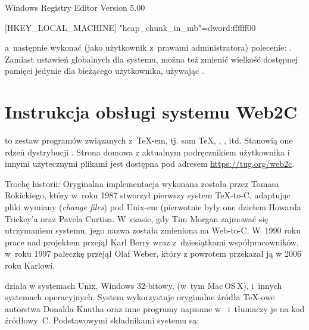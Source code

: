 \documentclass{article}
\begin{document}
\begin{sverbatim}
Windows Registry Editor Version 5.00

[HKEY_LOCAL_MACHINE\Software\Cygwin]
"heap_chunk_in_mb"=dword:ffffff00
\end{sverbatim}

\noindent a~następnie wykonać (jako użytkownik z~prawami administratora)
polecenie: .  Zamiast ustawień globalnych dla
systemu, można też zmienić wielkość dostępnej pamięci jedynie dla bieżącego
użytkownika, używając .


\section{Instrukcja obsługi systemu Web2C}

\Webc{} to zestaw programów związanych z~\TeX-em, tj.  sam \TeX{}, \MF{},
\MP, \BibTeX{} itd. Stanowią one rdzeń dystrybucji \TL{}. Strona domowa \Webc{} z aktualnym
podręcznikiem użytkownika i innymi użytecznymi plikami jest dostępna pod adresem \url{https://tug.org/web2c}.

Trochę historii: Oryginalna implementacja wykonana została przez Tomasa Rokickiego, który
w~roku 1987 stworzył pierwszy system \TeX{}-to-C, adaptując pliki wymiany
(\emph{change files}) pod Unix-em (pierwotnie były one dziełem Howarda
Trickey'a oraz Pavela Curtisa.  W~czasie, gdy Tim Morgan zajmować się  utrzymaniem
systemu, jego nazwa została zmieniona na Web-to-C\@. W~1990 roku prace nad
projektem przejął Karl Berry wraz z~dziesiątkami współpracowników, w~roku
1997 pałeczkę przejął Olaf Weber, który z powrotem przekazał ją w 2006 roku Karlowi.

\Webc{} działa w systemach Unix, Windows 32-bitowy, (w~tym Mac\,OS\,X),
 i~innych systemach operacyjnych.
System wykorzystuje oryginalne źródła \TeX-owe autorstwa Donalda Knutha
oraz inne programy napisane w~\web{} i~tłumaczy je na kod źródłowy~C.
Podstawowymi składnikami systemu są:
\end{document}
